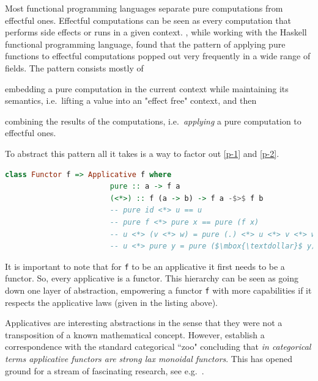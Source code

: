 \documentclass[
  oneside,
  11pt, a4paper,
  footinclude=true,
  headinclude=true,
  cleardoublepage=empty
]{scrbook}
\theoremstyle{definition}
\theoremstyle{definition}
\begin{document}
    Most functional programming languages separate pure computations from effectful ones. Effectful computations can be seen as every computation that performs side effects or runs in a given context. \cite{mcbride2008applicative}, while working with the Haskell functional programming language, found that the pattern of applying pure functions to effectful computations popped out very frequently in a wide range of fields. The pattern consists mostly of
	    \begin{inparaenum}
            \item embedding a pure computation in the current context while maintaining its semantics, i.e.\ lifting a value into an "effect free" context,\label{p-1} and then
            \item combining the results of the computations, i.e.\ \emph{applying} a pure computation to effectful ones.\label{p-2}
        \end{inparaenum}
	To abstract this pattern all it takes is a way to factor out \ref{p-1} and \ref{p-2}.
	             
	            \begin{lstlisting}[mathescape, language=Haskell, caption={Applicative laws},captionpos=b]
	                class Functor f => Applicative f where
	                    pure :: a -> f a
	                    (<*>) :: f (a -> b) -> f a -$>$ f b
	                    -- pure id <*> u == u
	                    -- pure f <*> pure x == pure (f x)
	                    -- u <*> (v <*> w) = pure (.) <*> u <*> v <*> w
	                    -- u <*> pure y = pure ($\mbox{\textdollar}$ y) <*> u
	            \end{lstlisting}{}
	            
    It is important to note that for \texttt{f} to be an applicative it first needs to be a functor. So, every applicative is a functor. This hierarchy can be seen as going down one layer of abstraction, empowering a functor \texttt{f} with more capabilities if it respects the applicative laws (given in the listing above).
	            
	Applicatives are interesting abstractions in the sense that they were not a transposition of a known mathematical concept. However, \cite{mcbride2008applicative} establish a correspondence with the standard categorical ``zoo" concluding that \emph{in categorical terms applicative functors are strong lax monoidal functors}. This has opened ground for a stream of fascinating research, see e.g.\ \citep{Paterson:2012:CAF:2368298.2368321, Cooper:2008:EFA:1485346.1485361, DBLP:journals/corr/CapriottiK14}.
	        
\end{document}
